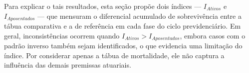 Para explicar o tais resultados, esta seção propõe dois índices — $I_{Ativos}$ e $I_{Aposentados}$ — que mensuram o diferencial acumulado de sobrevivência entre a tábua comparativa e a de referência em cada fase do ciclo previdenciário. Em geral, inconsistências ocorrem quando $I_{Ativos} > I_{Aposentados}$, embora casos com o padrão inverso também sejam identificados, o que evidencia uma limitação do índice. Por considerar apenas a tábua de mortalidade, ele não captura a influência das demais premissas atuariais.